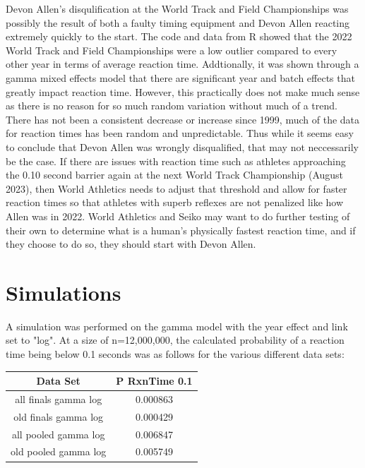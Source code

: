 \documentclass[12pt, letterpaper, titlepage]{article}
\begin{document}
Devon Allen's disqulification at the World Track and Field Championships was
possibly the result of both a faulty timing equipment and Devon Allen
reacting extremely quickly to the start.  The code and data from R showed that
the 2022 World Track and Field Championships were a low outlier compared to
every other year in terms of average reaction time.  Addtionally, it was shown
through a gamma mixed effects model that there are significant year and batch
effects that greatly impact reaction time.  However, this practically does not make much sense
as there is no reason for so much random variation without much of a trend.
There has not been a consistent decrease or increase since 1999, much of the data
for reaction times has been random and unpredictable.  Thus while it seems easy
to conclude that Devon Allen was wrongly disqualified, that may not neccessarily
be the case.  If there are issues with reaction time such as athletes approaching the 0.10 
second barrier again at the next World Track Championship (August 2023), then World Athletics 
needs to adjust that threshold and allow for faster reaction times so that athletes with superb 
reflexes are not penalized like how Allen was in 2022.  World Athletics and Seiko 
may want to do further testing of their own to determine what is a human's physically
fastest reaction time, and if they choose to do so, they should start with Devon
Allen.


\section{Simulations}
\label{sec:simulation}

A simulation was performed on the gamma model with the year effect and link set
to "log". At a size of n=12,000,000, the calculated probability of a reaction
time being below 0.1 seconds was as follows for the various different data sets:

\begin{center}
  \begin{tabular}{||c|c||} 
   \hline
   Data Set & P RxnTime 0.1 \\ 
   \hline\hline
   all finals gamma log & 0.000863 \\ 
   \hline
   old finals gamma log & 0.000429 \\
   \hline
   all pooled gamma log & 0.006847 \\
   \hline
   old pooled gamma log & 0.005749 \\
  \end{tabular}
  \end{center}
\end{document}
